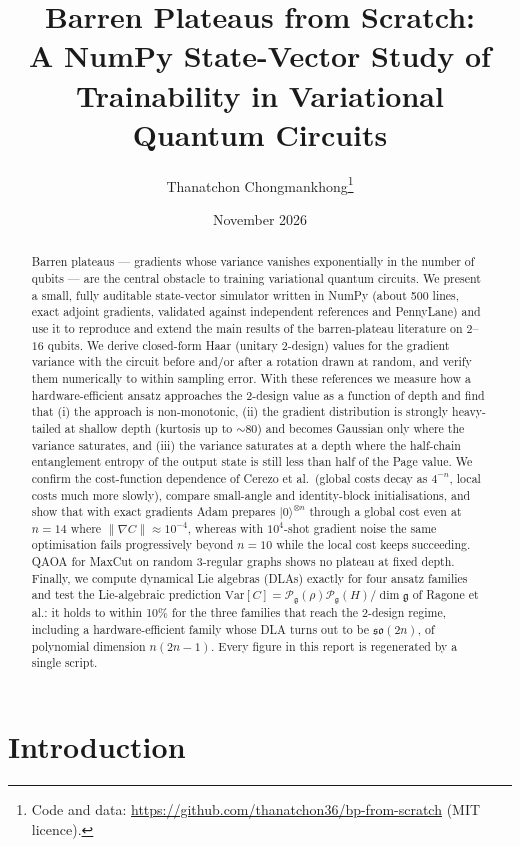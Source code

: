 \documentclass[11pt]{article}
\title{Barren Plateaus from Scratch:\\ \large A NumPy State-Vector Study of Trainability in Variational Quantum Circuits}
\author{Thanatchon Chongmankhong\thanks{Code and data: \url{https://github.com/thanatchon36/bp-from-scratch} (MIT licence).}}
\date{November 2026}
\newcommand{\Var}{\mathrm{Var}}
\newcommand{\g}{\mathfrak{g}}
\begin{document}
\maketitle

\begin{abstract}
Barren plateaus --- gradients whose variance vanishes exponentially in the number of qubits --- are the central obstacle to training variational quantum circuits. We present a small, fully auditable state-vector simulator written in NumPy (about 500 lines, exact adjoint gradients, validated against independent references and PennyLane) and use it to reproduce and extend the main results of the barren-plateau literature on $2$--$16$ qubits. We derive closed-form Haar (unitary 2-design) values for the gradient variance with the circuit before and/or after a rotation drawn at random, and verify them numerically to within sampling error. With these references we measure how a hardware-efficient ansatz approaches the 2-design value as a function of depth and find that (i) the approach is non-monotonic, (ii) the gradient distribution is strongly heavy-tailed at shallow depth (kurtosis up to $\sim 80$) and becomes Gaussian only where the variance saturates, and (iii) the variance saturates at a depth where the half-chain entanglement entropy of the output state is still less than half of the Page value. We confirm the cost-function dependence of Cerezo et al.\ (global costs decay as $4^{-n}$, local costs much more slowly), compare small-angle and identity-block initialisations, and show that with exact gradients Adam prepares $|0\rangle^{\otimes n}$ through a global cost even at $n=14$ where $\|\nabla C\|\approx 10^{-4}$, whereas with $10^4$-shot gradient noise the same optimisation fails progressively beyond $n=10$ while the local cost keeps succeeding. QAOA for MaxCut on random 3-regular graphs shows no plateau at fixed depth. Finally, we compute dynamical Lie algebras (DLAs) exactly for four ansatz families and test the Lie-algebraic prediction $\Var[C]=\mathcal P_\g(\rho)\mathcal P_\g(H)/\dim\g$ of Ragone et al.: it holds to within 10\% for the three families that reach the 2-design regime, including a hardware-efficient family whose DLA turns out to be $\mathfrak{so}(2n)$, of polynomial dimension $n(2n-1)$. Every figure in this report is regenerated by a single script.
\end{abstract}

\section{Introduction}
\end{document}
